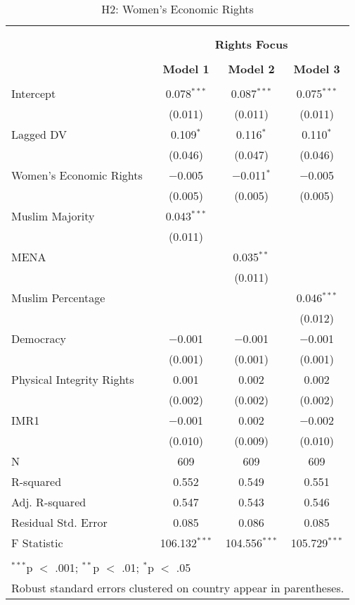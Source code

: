 
\begin{table}[!htbp] \centering 
  \caption{H2: Women's Economic Rights} 
  \label{} 
\begin{tabular}{@{\extracolsep{5pt}}lccc} 
\\[-1.8ex]\hline \\[-1.8ex] 
\\[-1.8ex] & \multicolumn{3}{c}{\textbf{Rights Focus}} \\ 
\\[-1.8ex] & \textbf{Model 1} & \textbf{Model 2} & \textbf{Model 3}\\ 
\hline \\[-1.8ex] 
 Intercept & 0.078$^{***}$ & 0.087$^{***}$ & 0.075$^{***}$ \\ 
  & (0.011) & (0.011) & (0.011) \\ 
  Lagged DV & 0.109$^{*}$ & 0.116$^{*}$ & 0.110$^{*}$ \\ 
  & (0.046) & (0.047) & (0.046) \\ 
  Women's Economic Rights & $-$0.005 & $-$0.011$^{*}$ & $-$0.005 \\ 
  & (0.005) & (0.005) & (0.005) \\ 
  Muslim Majority & 0.043$^{***}$ &  &  \\ 
  & (0.011) &  &  \\ 
  MENA &  & 0.035$^{**}$ &  \\ 
  &  & (0.011) &  \\ 
  Muslim Percentage &  &  & 0.046$^{***}$ \\ 
  &  &  & (0.012) \\ 
  Democracy & $-$0.001 & $-$0.001 & $-$0.001 \\ 
  & (0.001) & (0.001) & (0.001) \\ 
  Physical Integrity Rights & 0.001 & 0.002 & 0.002 \\ 
  & (0.002) & (0.002) & (0.002) \\ 
  IMR1 & $-$0.001 & 0.002 & $-$0.002 \\ 
  & (0.010) & (0.009) & (0.010) \\ 
 N & 609 & 609 & 609 \\ 
R-squared & 0.552 & 0.549 & 0.551 \\ 
Adj. R-squared & 0.547 & 0.543 & 0.546 \\ 
Residual Std. Error & 0.085 & 0.086 & 0.085 \\ 
F Statistic & 106.132$^{***}$ & 104.556$^{***}$ & 105.729$^{***}$ \\ 
\hline \\[-1.8ex] 
\multicolumn{4}{l}{$^{***}$p $<$ .001; $^{**}$p $<$ .01; $^{*}$p $<$ .05} \\ 
\multicolumn{4}{l}{Robust standard errors clustered on country appear in parentheses.} \\ 
\end{tabular} 
\end{table} 
